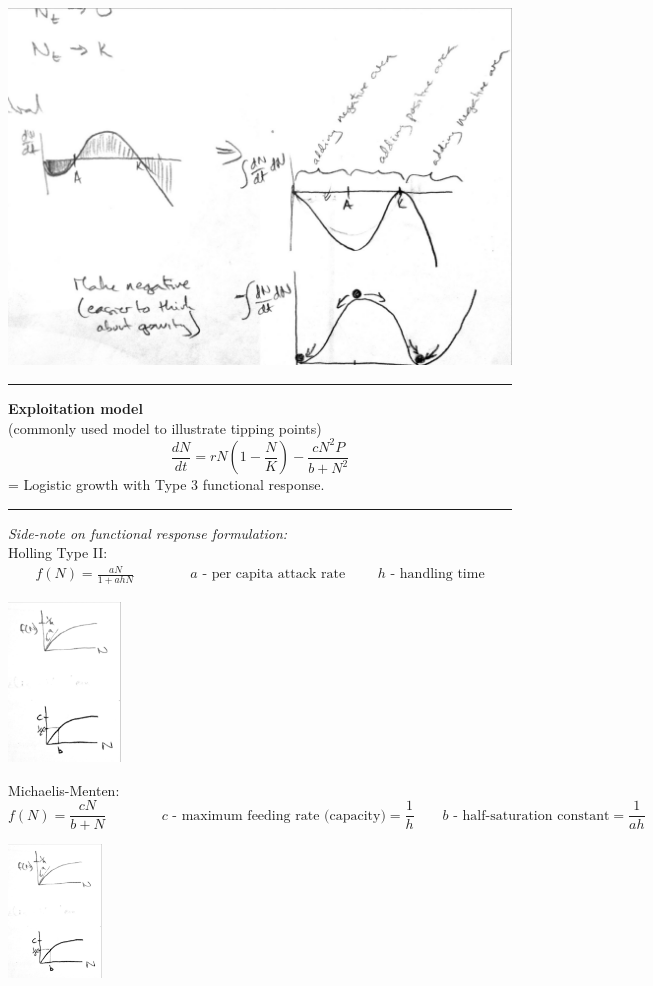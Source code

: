 \documentclass{article}
\newcommand{\ind}{\-\hspace{1cm}}
\begin{document}
\begin{center}
 	\includegraphics[width=14cm]{figs/LogisticAllee_Potential.pdf}
\end{center}

\rule[0.5ex]{\linewidth}{1pt}
\textbf{Exploitation model}\\
\ind (commonly used model to illustrate tipping points)
\begin{equation*}
	\frac{dN}{dt}=rN\left(1-\frac{N}{K}\right) - \frac{cN^2 P}{b+N^2}
\end{equation*}
\ind = Logistic growth with Type 3 functional response.

\rule[0.5ex]{5cm}{1pt}

\emph{Side-note on functional response formulation:}\\
Holling Type II:
\begin{align*}
	f(N)=\frac{aN}{1+ahN} \qquad \qquad a \text{ - per capita attack rate } \qquad h \text{ - handling time}
\end{align*}
\begin{center}
 	\includegraphics[width=3cm]{figs/TypeII-Holling.pdf}
\end{center}
 Michaelis-Menten:
\begin{equation*}
	f(N)=\frac{cN}{b+N} \qquad \qquad c \text{ - maximum feeding rate (capacity)}= \frac{1}{h} \qquad b \text{ - half-saturation constant} = \frac{1}{ah}
\end{equation*}
\begin{center}
 	\includegraphics[width=2.5cm]{figs/TypeII-MM.pdf}
\end{center}
\end{document}
